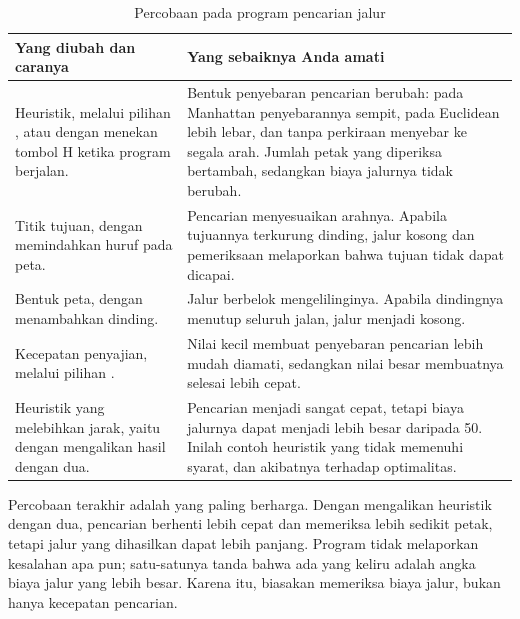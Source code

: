 \begin{table}[htbp]
\centering
\caption{Percobaan pada program pencarian jalur}
\label{tab:percobaan-ch10}
{\setlength{\tabcolsep}{4pt}\footnotesize%
\begin{tabularx}{\textwidth}{@{}L{5.6cm} Y@{}}
\toprule
\headrow \textbf{Yang diubah dan caranya} & \textbf{Yang sebaiknya Anda amati} \\
\midrule
Heuristik, melalui pilihan , atau dengan menekan tombol H
ketika program berjalan. &
Bentuk penyebaran pencarian berubah: pada Manhattan penyebarannya sempit, pada
Euclidean lebih lebar, dan tanpa perkiraan menyebar ke segala arah. Jumlah
petak yang diperiksa bertambah, sedangkan biaya jalurnya tidak berubah. \\
\addlinespace
Titik tujuan, dengan memindahkan huruf  pada peta. &
Pencarian menyesuaikan arahnya. Apabila tujuannya terkurung dinding, jalur
kosong dan pemeriksaan melaporkan bahwa tujuan tidak dapat dicapai. \\
\addlinespace
Bentuk peta, dengan menambahkan dinding. &
Jalur berbelok mengelilinginya. Apabila dindingnya menutup seluruh jalan,
jalur menjadi kosong. \\
\addlinespace
Kecepatan penyajian, melalui pilihan . &
Nilai kecil membuat penyebaran pencarian lebih mudah diamati, sedangkan nilai
besar membuatnya selesai lebih cepat. \\
\addlinespace
Heuristik yang melebihkan jarak, yaitu dengan mengalikan hasil
 dengan dua. &
Pencarian menjadi sangat cepat, tetapi biaya jalurnya dapat menjadi lebih besar
daripada 50. Inilah contoh heuristik yang tidak memenuhi syarat, dan
akibatnya terhadap optimalitas. \\
\bottomrule
\end{tabularx}}
\end{table}

\begin{peringatanbox}
Percobaan terakhir adalah yang paling berharga. Dengan mengalikan heuristik
dengan dua, pencarian berhenti lebih cepat dan memeriksa lebih sedikit petak,
tetapi jalur yang dihasilkan dapat lebih panjang. Program
tidak melaporkan kesalahan apa pun; satu-satunya tanda bahwa ada yang keliru
adalah angka biaya jalur yang lebih besar. Karena itu, biasakan memeriksa biaya
jalur, bukan hanya kecepatan pencarian.
\end{peringatanbox}

